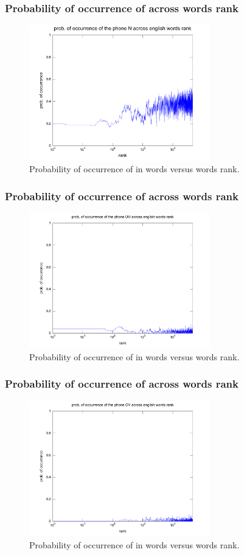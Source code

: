\documentclass[notes]{beamer}
\begin{document}
\frame
{
  \frametitle{Probability of occurrence of \textipa{[n]} across words rank}
\begin{figure}[h!]
\centering
\includegraphics[width=0.7\textwidth]{images/proboccwordsphone_N.pdf}
\caption{Probability of occurrence of \textipa{[n]} in words versus words rank.}
\label{fig:proboccwordsphone_N}
\end{figure} 
}


\frame
{
  \frametitle{Probability of occurrence of \textipa{[U]} across words rank}
\begin{figure}[h!]
\centering
\includegraphics[width=0.7\textwidth]{images/proboccwordsphone_UH.pdf}
\caption{Probability of occurrence of \textipa{[U]} in words versus words rank.}
\label{fig:proboccwordsphone_UH}
\end{figure} 
}


\frame
{
  \frametitle{Probability of occurrence of \textipa{[OI]} across words rank}
\begin{figure}[h!]
\centering
\includegraphics[width=0.7\textwidth]{images/proboccwordsphone_OY.pdf}
\caption{Probability of occurrence of \textipa{[OI]} in words versus words rank.}
\label{fig:proboccwordsphone_OY}
\end{figure} 
}
\end{document}
